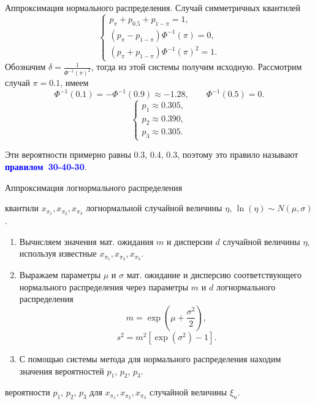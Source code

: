 \documentclass[ucs, notheorems, handout]{beamer}
\newenvironment{pr1}{\par\noindent{\bf Дано:}}{}
\newenvironment{pr3}{\par\noindent{\bf Результат:}}{}
\begin{document}
\begin{frame}{Аппроксимация нормального распределения. Случай симметричных квантилей}
		\begin{equation*}
		\begin{cases}
			p_{\pi}+p_{0.5}+p_{1-\pi} =1,\\ 
			(p_{\pi}-p_{1-\pi})\Phi ^{-1}(\pi) =0,\\ 
			(p_{\pi}+p_{1-\pi})\Phi ^{-1}(\pi)^{2}=1.
		\end{cases}\label{9}
	\end{equation*}
	Обозначим $\delta  = \displaystyle{\frac{1}{\Phi ^{-1}(\pi)^{2}}}$, тогда из этой системы получим исходную.
	Рассмотрим случай $\pi = 0.1$, имеем 
	$$\Phi ^{-1}(0.1) = -\Phi ^{-1}(0.9) \approx  -1.28, \qquad \Phi ^{-1}(0.5) = 0. $$
	\begin{equation*}
		\begin{cases}
			p_{1}\approx 0.305, \\ 
			p_{2}\approx 0.390,  \\ 
			p_{3}\approx 0.305.
		\end{cases}
	\end{equation*}
	
	Эти вероятности примерно равны 0.3, 0.4, 0.3, поэтому это правило называют \textcolor{blue}{\hbox{\textbf{правилом 30-40-30}}}.
	
\end{frame}	
	
	\begin{frame}{Аппроксимация логнормального распределения}
			\begin{pr1}
				квантили $x_{\pi_{1}}, x_{\pi_{2}}, x_{\pi_{3}}$ логнормальной случайной величины $\eta$, $\ln(\eta) \sim N(\mu, \sigma)$.
			\end{pr1}
			\begin{enumerate}
				\item Вычисляем значения мат. ожидания $m$ и дисперсии $d$ случайной величины $\eta$, используя известные $x_{\pi_{1}}, x_{\pi_{2}}, x_{\pi_{3}}$.
				\item Выражаем параметры $\mu$ и $\sigma$ мат. ожидание и дисперсию соответствующего нормального распределения через параметры $m$ и $d$ логнормального распределения
				\begin{equation*}
					m = \exp(\mu+\frac{\sigma ^{2}}{2}),
				\end{equation*} \label{10}
				\begin{equation*}
					s^{2} = m^{2}[\exp(\sigma^{2})-1].
				\end{equation*} \label{11}
				\item С помощью системы метода для нормального распределения находим значения вероятностей $p_{1}$, $p_{2}$, $p_{3}$.
			\end{enumerate}
			\begin{pr3}\end{pr3} вероятности $p_{1}$, $p_{2}$, $p_{3}$ для $x_{\pi_{1}}, x_{\pi_{2}}, x_{\pi_{3}}$ случайной величины $\xi_{n}$.
		
	\end{frame}
	
\end{document}
